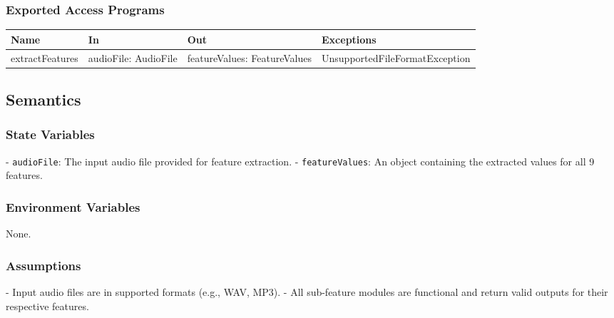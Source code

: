 \documentclass[12pt, titlepage]{article}
\begin{document}
\subsubsection{Exported Access Programs}

\begin{center}
\begin{tabular}{p{2cm} p{4cm} p{4cm} p{2cm}}
\hline
\textbf{Name} & \textbf{In} & \textbf{Out} & \textbf{Exceptions}\\
\hline
extractFeatures & audioFile: AudioFile & featureValues: FeatureValues & UnsupportedFileFormatException \\
\hline
\end{tabular}
\end{center}

\subsection{Semantics}

\subsubsection{State Variables}
- \texttt{audioFile}: The input audio file provided for feature extraction.
- \texttt{featureValues}: An object containing the extracted values for all 9 features.

\subsubsection{Environment Variables}
None.

\subsubsection{Assumptions}
- Input audio files are in supported formats (e.g., WAV, MP3).
- All sub-feature modules are functional and return valid outputs for their respective features.
\end{document}
